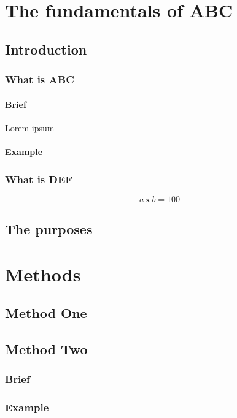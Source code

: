 \documentclass[12pt]{book}
\renewcommand{\times}{ \hspace{2pt}\textbf{x}\hspace{2pt} }
\begin{document}
\tableofcontents



\part{The fundamentals of ABC}

\chapter{Introduction}

\section{What is ABC}
\blindtext
\subsection{Brief}
Lorem ipsum
\subsection{Example}
\blindtext

\section{What is DEF}
\blindtext
\[ a \times b = 100 \]

\chapter{The purposes}
\blindtext



\part{Methods}

\chapter{Method One}
\Blindtext[2]

\chapter{Method Two}
\section{Brief}
\blindtext
\section{Example}
\blindtext
\end{document}
